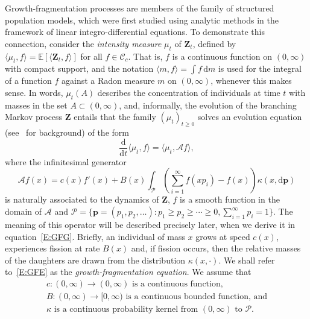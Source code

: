 \documentclass[11pt]{article}
\theoremstyle{definition}
\providecommand{\mathof}[1]{\mathrm{#1}}
\numberwithin{equation}{section}
\numberwithin{figure}{section}
\numberwithin{table}{section}
\newcommand\Zz{\mathbf{Z}}
\newcommand\Pp{\mathcal{P}}
\newcommand\EE{\mathbb{E}}
\newcommand\pp{\mathbf{p}}
\newcommand{\crochet}[1]{{\langle #1 \rangle}}
\newcommand\dd{\mathof{d}}
\begin{document}
Growth-fragmentation processes are members of the family of structured population models, which were first studied using analytic methods in the framework of linear integro-differential equations. To demonstrate this connection, consider the \emph{intensity measure} $\mu_t$ of $\Zz_t$, defined by $\crochet{\mu_t,f} = \EE[\crochet{ \Zz_t,f}]$ for all $f\in{\mathcal C}_c$. That is, $f$ is a continuous function on $(0,\infty)$ with compact support, and the notation $\crochet{m,f} = \int f \, \dd m$ is used for the integral of a function $f$ against a Radon measure $m$ on $(0,\infty)$, whenever this makes sense. In words, $\mu_t(A)$ describes the concentration of individuals at time $t$ with masses in the set $A\subset (0,\infty)$, and, informally, the evolution of the branching Markov process $\Zz$ entails that the family $(\mu_t)_{t\geq 0}$ solves an evolution equation (see~\cite{EN00} for background) of the form
\begin{equation}\label{E:GFE}
\frac{\dd }{\dd t} \crochet{\mu_t,f}= \crochet{ \mu_t, {\mathcal A} f},
\end{equation}
where the infinitesimal generator
\[
{\mathcal A}f(x) = c(x) f'(x) + {B}(x) \int_{\Pp} \left(\sum_{i=1}^{\infty}f(xp_i)-f(x)\right)\kappa(x, \dd \pp)
\]
is naturally associated to the dynamics of $\Zz$, $f$ is a smooth function in the domain of ${\mathcal A}$ and $\Pp = \{ \mathbf{p} = (p_1,p_2,\dotsc) : p_1 \ge p_2 \ge \dotsb \ge 0, \sum_{i=1}^\infty p_i = 1\}$. The meaning of this operator will be described precisely later, when we derive it in equation~\eqref{E:GFG}. Briefly, an individual of mass $x$ grows at speed $c(x)$, experiences fission at rate $B(x)$ and, if fission occurs, then the relative masses of the daughters are drawn from the distribution $\kappa(x,\cdot)$. We shall refer to~\eqref{E:GFE} as the \emph{growth-fragmentation equation}. We assume that
\begin{gather}
c\colon (0,\infty)\to (0,\infty) \text{ is a continuous function,}\label{e:assump-c}
\\
B\colon (0,\infty) \to [0,\infty) \text{ is a continuous bounded function, and}\label{e:assump-B}
\\
\kappa \text{ is a continuous probability kernel from } (0,\infty) \text{ to } \Pp.\label{e:assump-kappa}
\end{gather}
\end{document}
